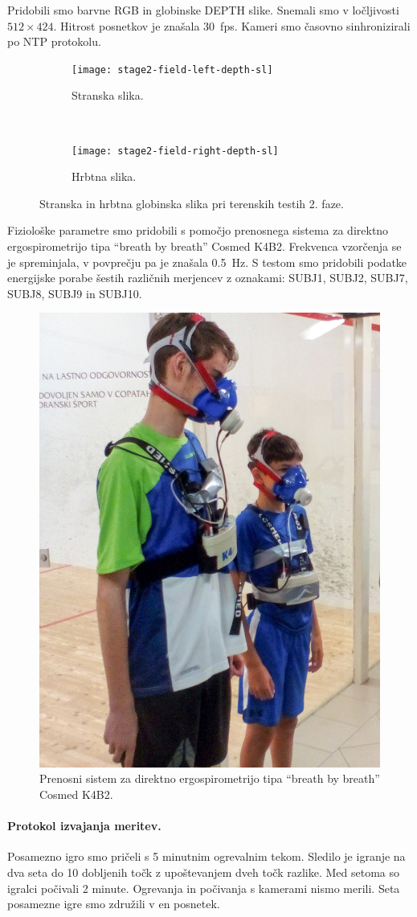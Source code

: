 Pridobili smo barvne RGB in globinske DEPTH slike. Snemali smo v ločljivosti $512 \times 424$. Hitrost posnetkov je znašala \SI{30}{fps}. Kameri smo časovno sinhronizirali po NTP protokolu.


\begin{figure}[!htb]
	\centering
	\begin{subfigure}[t]{0.45\columnwidth}
		\texttt{[image: stage2-field-left-depth-sl]}
		\caption{Stranska slika.}
	\end{subfigure}
	~
	\begin{subfigure}[t]{0.45\columnwidth}
		\texttt{[image: stage2-field-right-depth-sl]}
		\caption{Hrbtna slika.}
	\end{subfigure}
	\caption[Stranska in hrbtna globinska slika pri terenskih testih 2. faze]{Stranska in hrbtna globinska slika pri terenskih testih 2. faze.}
	\label{fig:stage2-field-of-depth}
\end{figure}

Fiziološke parametre smo pridobili s pomočjo prenosnega sistema za direktno ergospirometrijo tipa ``breath  by breath'' Cosmed K4B2. Frekvenca vzorčenja se je spreminjala, v povprečju pa je znašala \SI{0.5}{\hertz}. S testom smo pridobili podatke energijske porabe šestih različnih merjencev z oznakami: SUBJ1, SUBJ2, SUBJ7, SUBJ8, SUBJ9 in SUBJ10.


\begin{figure}[!htb]
	\centering
	\includegraphics[width=0.4\columnwidth]{./Slike/squash-maske-corrected.jpg}	
	\caption[Prenosni sistem za direktno ergospirometrijo]{Prenosni sistem za direktno ergospirometrijo tipa ``breath  by breath'' Cosmed K4B2.}
	\label{fig:maske}
\end{figure}


\paragraph{Protokol izvajanja meritev.}
Posamezno igro smo pričeli s 5 minutnim ogrevalnim tekom. Sledilo je igranje na dva seta do 10 dobljenih točk z upoštevanjem dveh točk razlike. Med setoma so igralci počivali 2 minute. Ogrevanja in počivanja s kamerami nismo merili. Seta posamezne igre smo združili v en posnetek.
